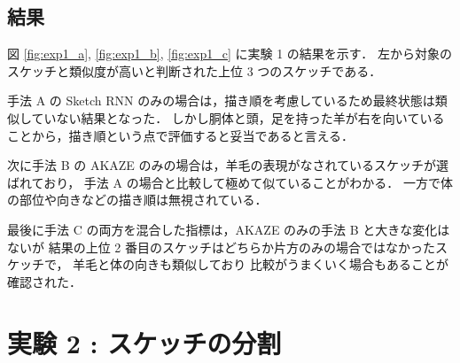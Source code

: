 \documentclass[twocolumn]{jarticle}     %
\begin{document}
\subsection{結果}



図 \ref{fig:exp1_a}, \ref{fig:exp1_b}, \ref{fig:exp1_c} に実験 1 の結果を示す．
左から対象のスケッチと類似度が高いと判断された上位 3 つのスケッチである．

手法 A の Sketch RNN のみの場合は，描き順を考慮しているため最終状態は類似していない結果となった．
しかし胴体と頭，足を持った羊が右を向いていることから，描き順という点で評価すると妥当であると言える．

次に手法 B の AKAZE のみの場合は，羊毛の表現がなされているスケッチが選ばれており，
手法 A の場合と比較して極めて似ていることがわかる．
一方で体の部位や向きなどの描き順は無視されている．

最後に手法 C の両方を混合した指標は，AKAZE のみの手法 B と大きな変化はないが
 結果の上位 2 番目のスケッチはどちらか片方のみの場合ではなかったスケッチで，
 羊毛と体の向きも類似しており 比較がうまくいく場合もあることが確認された．


\section{実験 2 : スケッチの分割}
\end{document}
